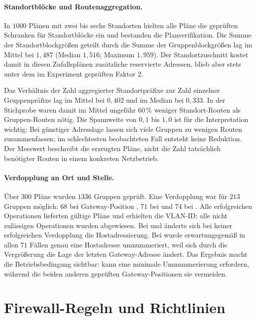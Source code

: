 \documentclass[a4paper,12pt, twoside]{report}
\theoremstyle{definition}
\newcommand{\code}[1]{\texttt{\detokenize{#1}}}
\begin{document}
\paragraph{Standortblöcke und Routenaggregation.}
In $1000$ Plänen mit zwei bis sechs Standorten hielten alle Pläne die geprüften Schranken für Standortblöcke ein und bestanden die Planverifikation. Die Summe der Standortblockgrößen geteilt durch die Summe der Gruppenblockgrößen lag im Mittel bei $1{,}487$ (Median $1{,}516$; Maximum $1{,}959$). Der Standortzuschnitt kostet damit in diesen Zufallsplänen zusätzliche reservierte Adressen, blieb aber stets unter dem im Experiment geprüften Faktor $2$.

Das Verhältnis der Zahl aggregierter Standortpräfixe zur Zahl einzelner Gruppenpräfixe lag im Mittel bei $0{,}402$ und im Median bei $0{,}333$. In der Stichprobe waren damit im Mittel ungefähr $60\,\%$ weniger Standort-Routen als Gruppen-Routen nötig. Die Spannweite von $0{,}1$ bis $1{,}0$ ist für die Interpretation wichtig: Bei günstiger Adresslage lassen sich viele Gruppen zu wenigen Routen zusammenfassen; im schlechtesten beobachteten Fall entsteht keine Reduktion. Der Messwert beschreibt die erzeugten Pläne, nicht die Zahl tatsächlich benötigter Routen in einem konkreten Netzbetrieb.

\paragraph{Verdopplung an Ort und Stelle.}
Über $300$ Pläne wurden $1336$ Gruppen geprüft. Eine Verdopplung war für $213$ Gruppen möglich: $68$ bei Gateway-Position \code{first}, $71$ bei \code{last} und $74$ bei \code{none}. Alle erfolgreichen Operationen lieferten gültige Pläne und erhielten die VLAN-ID; alle nicht zulässigen Operationen wurden abgewiesen. Bei \code{first} und \code{none} änderte sich bei keiner erfolgreichen Verdopplung die Hostadressierung. Bei \code{last} wurde erwartungsgemäß in allen $71$ Fällen genau eine Hostadresse umnummeriert, weil sich durch die Vergrößerung die Lage der letzten Gateway-Adresse ändert. Das Ergebnis macht die Betriebsbedingung sichtbar: \code{last} kann eine minimale Umnummerierung erfordern, während die beiden anderen geprüften Gateway-Positionen sie vermeiden.

\section{Firewall-Regeln und Richtlinien}
\end{document}
